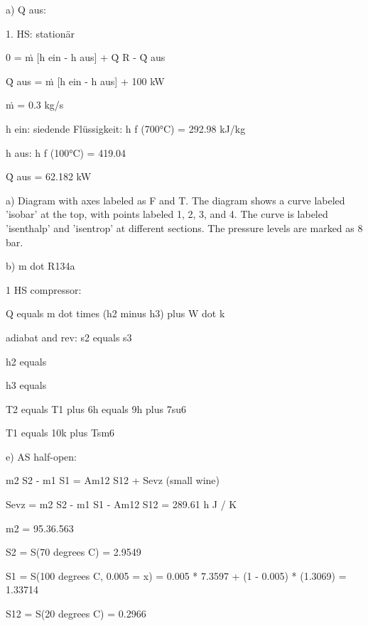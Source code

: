 a) Q aus:

1. HS: stationär

0 = ṁ [h ein - h aus] + Q̇ R - Q̇ aus

Q̇ aus = ṁ [h ein - h aus] + 100 kW

ṁ = 0.3 kg/s

h ein: siedende Flüssigkeit: h f (700°C) = 292.98 kJ/kg

h aus: h f (100°C) = 419.04

Q̇ aus = 62.182 kW

a) Diagram with axes labeled as F and T. The diagram shows a curve labeled 'isobar' at the top, with points labeled 1, 2, 3, and 4. The curve is labeled 'isenthalp' and 'isentrop' at different sections. The pressure levels are marked as 8 bar.

b) m dot R134a

1 HS compressor:

Q equals m dot times (h2 minus h3) plus W dot k

adiabat and rev: s2 equals s3

h2 equals 

h3 equals 

T2 equals T1 plus 6h equals 9h plus 7su6

T1 equals 10k plus Tsm6

e) AS half-open:

m2 S2 - m1 S1 = Am12 S12 + Sevz (small wine)

Sevz = m2 S2 - m1 S1 - Am12 S12 = 289.61 h J / K

m2 = 95.36.563

S2 = S(70 degrees C) = 2.9549

S1 = S(100 degrees C, 0.005 = x) = 0.005 * 7.3597 + (1 - 0.005) * (1.3069) = 1.33714

S12 = S(20 degrees C) = 0.2966
